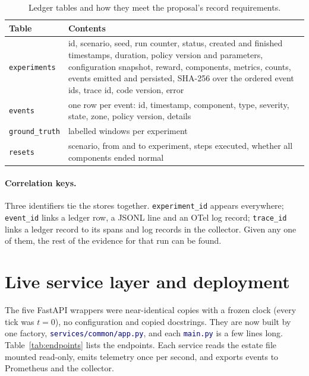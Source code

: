 \documentclass[11pt]{article}
\newcommand{\code}[1]{\texttt{\small #1}}
\newcommand{\file}[1]{\textcolor{navy}{\texttt{\small #1}}}
\begin{document}
\begin{table}[h]
\centering
\caption{Ledger tables and how they meet the proposal's record requirements.}
\label{tab:ledger}
\small
\begin{tabular}{>{\RaggedRight\arraybackslash}p{2.4cm} >{\RaggedRight\arraybackslash}p{11.2cm}}
\toprule
\textbf{Table} & \textbf{Contents}\\
\midrule
\code{experiments} & id, scenario, seed, run counter, status, created and finished timestamps, duration, policy version and parameters, configuration snapshot, reward, components, metrics, counts, events emitted and persisted, SHA-256 over the ordered event ids, trace id, code version, error\\
\code{events} & one row per event: id, timestamp, component, type, severity, state, zone, policy version, details\\
\code{ground\_truth} & labelled windows per experiment\\
\code{resets} & scenario, from and to experiment, steps executed, whether all components ended normal\\
\bottomrule
\end{tabular}
\end{table}

\paragraph{Correlation keys.} Three identifiers tie the stores together.
\code{experiment\_id} appears everywhere; \code{event\_id} links a ledger row, a
JSONL line and an OTel log record; \code{trace\_id} links a ledger record to its
spans and log records in the collector. Given any one of them, the rest of the
evidence for that run can be found.

\section{Live service layer and deployment}
\label{sec:services}
The five FastAPI wrappers were near-identical copies with a frozen clock (every
tick was $t=0$), no configuration and copied docstrings. They are now built by
one factory, \file{services/common/app.py}, and each \file{main.py} is a few lines
long. Table~\ref{tab:endpoints} lists the endpoints. Each service reads the estate
file mounted read-only, emits telemetry once per second, and exports events to
Prometheus and the collector.
\end{document}
